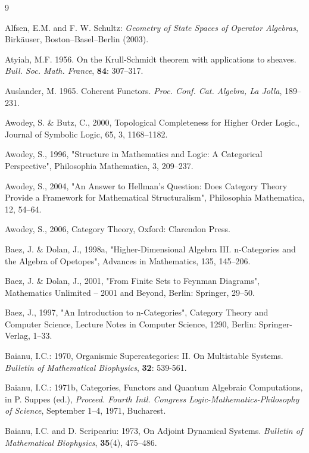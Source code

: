 \documentclass[12pt]{article}
\theoremstyle{plain}
\theoremstyle{definition}
\numberwithin{equation}{section}
\newcommand{\<}{{\langle}}
\begin{document}
\begin{thebibliography} {9}

Alfsen, E.M. and F. W. Schultz: \emph{Geometry of State Spaces of Operator Algebras}, Birk\"auser, Boston--Basel--Berlin (2003).

Atyiah, M.F. 1956. On the Krull-Schmidt theorem with applications to sheaves.
\emph{Bull. Soc. Math. France}, \textbf{84}: 307--317.

Auslander, M. 1965. Coherent Functors. \emph{Proc. Conf. Cat. Algebra, La Jolla},
189--231.
  
Awodey, S. \& Butz, C., 2000, Topological Completeness for Higher Order Logic., Journal of Symbolic Logic, 65, 3, 1168--1182. 


Awodey, S., 1996, "Structure in Mathematics and Logic: A Categorical Perspective", Philosophia Mathematica, 3, 209--237. 

Awodey, S., 2004, "An Answer to Hellman's Question: Does Category Theory Provide a Framework for Mathematical Structuralism", Philosophia Mathematica, 12, 54--64. 

Awodey, S., 2006, Category Theory, Oxford: Clarendon Press. 

Baez, J. \& Dolan, J., 1998a, "Higher-Dimensional Algebra III. n-Categories and the Algebra of Opetopes", Advances in Mathematics, 135, 145--206.  


Baez, J. \& Dolan, J., 2001, "From Finite Sets to Feynman Diagrams", Mathematics Unlimited -- 2001 and Beyond, Berlin: Springer, 29--50.  

Baez, J., 1997, "An Introduction to n-Categories", Category Theory and Computer Science, Lecture Notes in Computer Science, 1290, Berlin: Springer-Verlag, 1--33. 

Baianu, I.C.: 1970, Organismic Supercategories: II. On Multistable Systems. \emph{Bulletin of Mathematical Biophysics}, \textbf{32}: 539-561.
 
Baianu, I.C.: 1971b, Categories, Functors and Quantum Algebraic
Computations, in P. Suppes (ed.), \emph{Proceed. Fourth Intl. Congress Logic-Mathematics-Philosophy of Science}, September 1--4, 1971, Bucharest.

Baianu, I.C. and D. Scripcariu: 1973, On Adjoint Dynamical Systems. \emph{Bulletin of Mathematical Biophysics}, \textbf{35}(4), 475--486.


\end{thebibliography}
\end{document}
